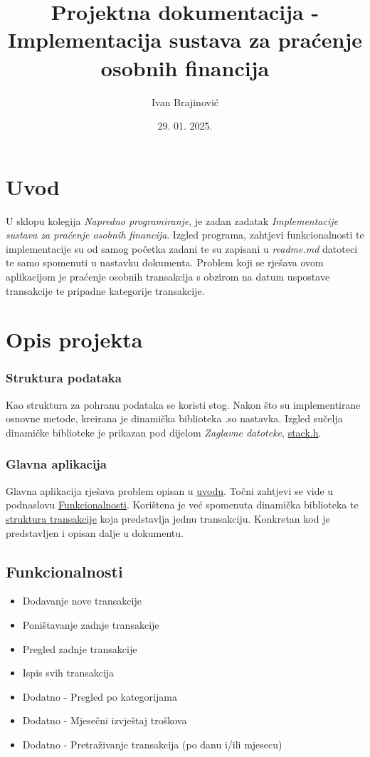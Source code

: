 \documentclass[12pt, letterpaper]{article}
\title{Projektna dokumentacija - Implementacija sustava za praćenje osobnih financija}
\author{Ivan Brajinović}
\date{29. 01. 2025.}
\begin{document}
	\maketitle

	\newpage
  \section{Uvod} \label{uvod}
  U sklopu kolegija \textit{Napredno programiranje}, je zadan zadatak \textit{Implementacije sustava za praćenje osobnih financija}. Izgled programa, zahtjevi funkcionalnosti te implementacije su od samog početka zadani te su zapisani u \textit{readme.md} datoteci te samo spomenuti u nastavku dokumenta. Problem koji se rješava ovom aplikacijom je praćenje osobnih transakcija s obzirom na datum uspostave transakcije te pripadne kategorije transakcije. 

  \section{Opis projekta}
  \subsubsection{Struktura podataka}
  Kao struktura za pohranu podataka se koristi stog. Nakon što su implementirane osnovne metode, kreirana je dinamička biblioteka .so nastavka. Izgled sučelja dinamičke biblioteke je prikazan pod dijelom \textit{Zaglavne datoteke}, \hyperref[stack.h]{stack.h}.

  \subsubsection{Glavna aplikacija}
  Glavna aplikacija rješava problem opisan u \hyperref[uvod]{uvodu}. Točni zahtjevi se vide u podnaslovu \hyperref[funkcionalnost]{Funkcionalnosti}. Korištena je već spomenuta dinamička biblioteka te \hyperref[struct_transaction]{struktura transakcije} koja predstavlja jednu transakciju. Konkretan kod je predstavljen i opisan dalje u dokumentu.

  \subsection{Funkcionalnosti} \label{funkcionalnost}
  \begin{itemize}
    \item Dodavanje nove transakcije
    \item Poništavanje zadnje transakcije
    \item Pregled zadnje transakcije
    \item Ispis svih transakcija
    \item Dodatno - Pregled po kategorijama
    \item Dodatno - Mjesečni izvještaj troškova
    \item Dodatno - Pretraživanje transakcija (po danu i/ili mjesecu)
  \end{itemize}
\end{document}
